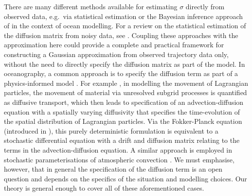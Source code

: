 There are many different methods available for estimating \(\sigma\) directly from observed data, e.g.\ via statistical estimation \citep{CotterPavliotis_2009_EstimatingEddyDiffusivities} or the Bayesian inference approach of \citet{YingEtAl_2019_BayesianInferenceOcean} in the context of ocean modelling.
For a review on the statistical estimation of the diffusion matrix from noisy data, see \citet{NielsenEtAl_2000_ParameterEstimationStochastic}.
Coupling these approaches with the approximation here could provide a complete and practical framework for constructing a Gaussian approximation from observed trajectory data only, without the need to directly specify the diffusion matrix as part of the model.
In oceanography, a common approach is to specify the diffusion term as part of a physics-informed model \citep{BerloffMcWilliams_2002_MaterialTransportOceanic}.
For example \citep{vanSebilleEtAl_2018_LagrangianOceanAnalysis,LiEtAl_2023_StochasticDataDrivenParameterization}, in modelling the movement of Lagrangian particles, the movement of material via unresolved subgrid processes is quantified as diffusive transport, which then leads to specification of an advection-diffusion equation with a spatially varying diffusivity that specifies the time-evolution of the spatial distribution of Lagrangian particles.
Via the Fokker-Planck equation (introduced in ), this purely deterministic formulation is equivalent to a stochastic differential equation with a drift and diffusion matrix relating to the terms in the advection-diffusion equation.
A similar approach is employed in stochastic parameterisations of atmospheric convection \citep{WilsonSawford_1996_ReviewLagrangianStochastic}.
We must emphasise, however, that in general the specification of the diffusion term is an open question and depends on the specifics of the situation and modelling choices.
Our theory is general enough to cover all of these aforementioned cases.

